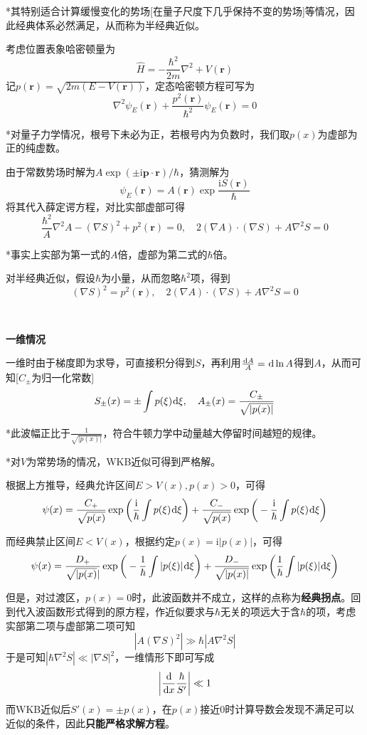 \documentclass[a4paper,UTF8,fontset=windows]{ctexart}
\newcommand*{\dr}{\hspace{0.07em}\mathrm{d}}
\newcommand*{\ir}{\mathrm{i}}
\newcommand*{\br}{\mathbf{r}}
\newcommand*{\bp}{\mathbf{p}}
\begin{document}
*其特别适合计算缓慢变化的势场[在量子尺度下几乎保持不变的势场]等情况，因此经典体系必然满足，从而称为半经典近似。

考虑位置表象哈密顿量为
$$\hat{H}=-\frac{\hbar^2}{2m}\nabla^2+V(\br)$$
记$p(\br)=\sqrt{2m(E-V(\br))}$，定态哈密顿方程可写为
$$\nabla^2\psi_E(\br)+\frac{p^2(\br)}{\hbar^2}\psi_E(\br)=0$$

*对量子力学情况，根号下未必为正，若根号内为负数时，我们取$p(x)$为虚部为正的纯虚数。

由于常数势场时解为$A\exp(\pm\ir\bp\cdot\br)/\hbar$，猜测解为
$$\psi_E(\br)=A(\br)\exp\frac{\ir S(\br)}{\hbar}$$
将其代入薛定谔方程，对比实部虚部可得
$$\frac{\hbar^2}{A}\nabla^2A-(\nabla S)^2+p^2(\br)=0,\quad 2(\nabla A)\cdot(\nabla S)+A\nabla^2S=0$$

*事实上实部为第一式的$A$倍，虚部为第二式的$\hbar$倍。

对半经典近似，假设$\hbar$为小量，从而忽略$\hbar^2$项，得到
$$(\nabla S)^2=p^2(\br),\quad2(\nabla A)\cdot(\nabla S)+A\nabla^2S=0$$

\

\textbf{一维情况}

一维时由于梯度即为求导，可直接积分得到$S$，再利用$\frac{\dr A}{A}=\dr\ln A$得到$A$，从而可知[$C_\pm$为归一化常数]
$$S_\pm(x)=\pm\int p(\xi)\dr\xi,\quad A_\pm(x)=\frac{C_\pm}{\sqrt{|p(x)|}}$$

*此波幅正比于$\frac{1}{\sqrt{|p(x)|}}$，符合牛顿力学中动量越大停留时间越短的规律。

*对$V$为常势场的情况，WKB近似可得到严格解。

根据上方推导，经典允许区间$E>V(x),p(x)>0$，可得
$$\psi(x)=\frac{C_+}{\sqrt{p(x)}}\exp\bigg(\frac{\ir}{\hbar}\int p(\xi)\dr\xi\bigg)+\frac{C_-}{\sqrt{p(x)}}\exp\bigg(-\frac{\ir}{\hbar}\int p(\xi)\dr\xi\bigg)$$

而经典禁止区间$E<V(x)$，根据约定$p(x)=\ir|p(x)|$，可得
$$\psi(x)=\frac{D_+}{\sqrt{|p(x)}|}\exp\bigg(-\frac{1}{\hbar}\int|p(\xi)|\dr\xi\bigg)+\frac{D_-}{\sqrt{|p(x)|}}\exp\bigg(\frac{1}{\hbar}\int|p(\xi)|\dr\xi\bigg)$$

但是，对过渡区，$p(x)=0$时，此波函数并不成立，这样的点称为\textbf{经典拐点}。回到代入波函数形式得到的原方程，作近似要求与$\hbar$无关的项远大于含$\hbar$的项，考虑实部第二项与虚部第二项可知
$$|A(\nabla S)^2|\gg\hbar|A\nabla^2 S|$$
于是可知$|\hbar\nabla^2 S|\ll|\nabla S|^2$，一维情形下即可写成
$$\bigg|\frac{\dr}{\dr x}\frac{\hbar}{S'}\bigg|\ll1$$
而WKB近似后$S'(x)=\pm p(x)$，在$p(x)$接近0时计算导数会发现不满足可以近似的条件，因此\textbf{只能严格求解方程}。
\end{document}
